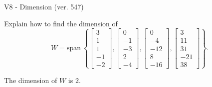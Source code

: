 \begin{exercise}
  \begin{exerciseTitle}V8 - Dimension (ver. 547)\end{exerciseTitle}
  \begin{exerciseStatement}
    Explain how to find the dimension of 
\[W=\mathrm{span}\ \left\{\left[\begin{array}{r}
3 \\
1 \\
1 \\
-1 \\
-2
\end{array}\right] , \left[\begin{array}{r}
0 \\
-1 \\
-3 \\
2 \\
-4
\end{array}\right] , \left[\begin{array}{r}
0 \\
-4 \\
-12 \\
8 \\
-16
\end{array}\right] , \left[\begin{array}{r}
3 \\
11 \\
31 \\
-21 \\
38
\end{array}\right]\right\}.\]



  \end{exerciseStatement}
  \begin{exerciseAnswer}
   The dimension of \(W\) is  \(2\).
  


  \end{exerciseAnswer}
\end{exercise}